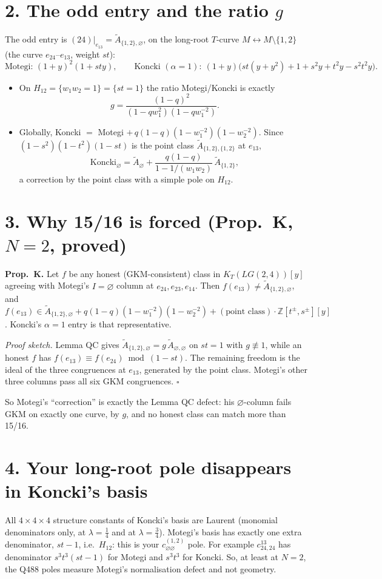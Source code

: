 \documentclass[10pt]{article}
\newcommand{\At}{\tilde A}
\begin{document}
\section*{2. The odd entry and the ratio $g$}
The odd entry is $(24)|_{e_{13}}=\At_{\{1,2\},\varnothing}$, on the long-root $T$-curve $M\leftrightarrow M\setminus\{1,2\}$ (the curve $e_{24}$--$e_{13}$, weight $st$):
\[ \text{Motegi: } (1+y)^2(1+sty),\qquad \text{Koncki } (\alpha=1):\ (1+y)\bigl(st(y+y^2)+1+s^2y+t^2y-s^2t^2y\bigr). \]
\begin{itemize}
\item On $H_{12}=\{w_1w_2=1\}=\{st=1\}$ the ratio Motegi/Koncki is exactly
\[ g=\frac{(1-q)^2}{(1-qw_1^2)(1-qw_1^{-2})}. \]
\item Globally, Koncki $=$ Motegi $+\,q(1-q)(1-w_1^{-2})(1-w_2^{-2})$. Since $(1-s^2)(1-t^2)(1-st)$ is the point class $\At_{\{1,2\},\{1,2\}}$ at $e_{13}$,
\[ \text{Koncki}_\varnothing=\At_\varnothing+\frac{q(1-q)}{1-1/(w_1w_2)}\,\At_{\{1,2\}}, \]
a correction by the point class with a simple pole on $H_{12}$.
\end{itemize}

\section*{3. Why 15/16 is forced (Prop.~K, $N=2$, proved)}
\textbf{Prop.~K.} Let $f$ be any honest (GKM-consistent) class in $K_T(LG(2,4))[y]$ agreeing with Motegi's $I=\varnothing$ column at $e_{24},e_{23},e_{14}$. Then
$f(e_{13})\neq\At_{\{1,2\},\varnothing}$, and $f(e_{13})\in\At_{\{1,2\},\varnothing}+q(1-q)(1-w_1^{-2})(1-w_2^{-2})+(\text{point class})\cdot\mathbb Z[t^\pm,s^\pm][y]$.
Koncki's $\alpha=1$ entry is that representative.

\emph{Proof sketch.} Lemma QC gives $\At_{\{1,2\},\varnothing}=g\,\At_{\varnothing,\varnothing}$ on $st=1$ with $g\not\equiv1$, while an honest $f$ has
$f(e_{13})\equiv f(e_{24})\bmod(1-st)$. The remaining freedom is the ideal of the three congruences at $e_{13}$, generated by the point class. Motegi's other three columns pass all six GKM
congruences. $\square$

So Motegi's ``correction'' is exactly the Lemma QC defect: his $\varnothing$-column fails GKM on exactly one curve, by $g$, and no honest class can match more than 15/16.

\section*{4. Your long-root pole disappears in Koncki's basis}
All $4\times4\times4$ structure constants of Koncki's basis are Laurent (monomial denominators only, at $\lambda=\frac14$ and at $\lambda=\frac34$).
Motegi's basis has exactly one extra denominator, $st-1$, i.e.\ $H_{12}$: this is your $c^{(1,2)}_{\varnothing\varnothing}$ pole.
For example $c^{13}_{24,24}$ has denominator $s^3t^3(st-1)$ for Motegi and $s^3t^3$ for Koncki.
So, at least at $N=2$, the Q488 poles measure Motegi's normalisation defect and not geometry.
\end{document}
